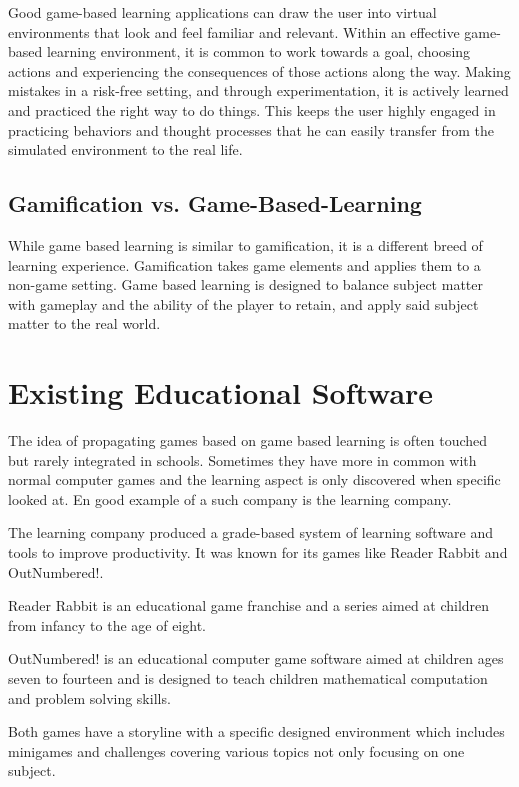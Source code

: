 Good game-based learning applications can draw the user into virtual environments that look and feel familiar and relevant.
Within an effective game-based learning environment, it is common to work towards a goal,
choosing actions and experiencing the consequences of those actions along the way.
Making mistakes in a risk-free setting, and through experimentation,
it is actively learned and practiced the right way to do things.
This keeps the user highly engaged in practicing behaviors and thought processes that he can easily transfer from the
simulated environment to the real life\cite{gal}.

\subsection{Gamification vs. Game-Based-Learning}\label{subsec:gamification-vs.-game-based-learning}
While game based learning is similar to gamification, it is a different breed of learning experience.
Gamification takes game elements and applies them to a non-game setting.
Game based learning is designed to balance subject matter with gameplay and the ability of the player to retain,
and apply said subject matter to the real world.

\section{Existing Educational Software}\label{sec:existing-educational-software}
The idea of propagating games based on game based learning is often touched but rarely integrated in schools.
Sometimes they have more in common with normal computer games and the learning aspect is only discovered when specific looked at.
En good example of a such company is the learning company\cite{tlc}.

The learning company produced a grade-based system of learning software and tools to improve productivity.
It was known for its games like Reader Rabbit\cite{readerrabbit} and OutNumbered!\cite{outnumbered}.

Reader Rabbit is an educational game franchise and a series aimed at children from infancy to the age of eight.

OutNumbered! is an educational computer game software aimed at children ages seven to fourteen and
is designed to teach children mathematical computation and problem solving skills.

Both games have a storyline with a specific designed environment which includes minigames and challenges covering
various topics not only focusing on one subject.

